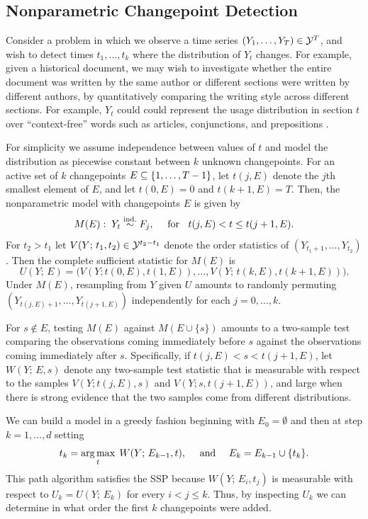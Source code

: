 \documentclass{article}
\begin{document}
\subsection{Nonparametric Changepoint Detection}\label{sec:nonpar}

Consider a problem in which we observe a time series $(Y_1,\ldots,Y_T)\in \mathcal{Y}^T$, and wish to detect times $t_1,\ldots,t_k$ where the distribution of $Y_t$ changes. For example, given a historical document, we may wish to investigate whether the entire document was written by the same author or different sections were written by different authors, by quantitatively comparing the writing style across different sections. For example, $Y_t$ could could represent the usage distribution in section $t$ over ``context-free'' words such as articles, conjunctions, and prepositions \citep[see e.g.,][]{chen2015graph}.

For simplicity we assume independence between values of $t$ and model the distribution as piecewise constant between $k$ unknown changepoints. For an active set of $k$ changepoints $E\subseteq \{1,\ldots, T-1\}$, let $t(j,E)$ denote the $j$th smallest element of $E$, and let $t(0,E)=0$ and $t(k+1, E)=T$. Then, the nonparametric model with changepoints $E$ is given by
\begin{equation}\label{eq:nonpar-model}
  M(E):\; Y_t \overset{\textrm{ind.}}{\sim} F_j, \quad \text{ for } \;\;t(j,E) < t \leq t(j+1,E).
\end{equation}
For $t_2>t_1$ let $V(Y;\, t_1, t_2)\in \mathcal{Y}^{t_2-t_1}$ denote the order statistics of $(Y_{t_1+1},\ldots, Y_{t_2})$. Then the complete sufficient statistic for $M(E)$ is
\[
U(Y; \, E) = 
\bigg(
V(Y; t(0, E), t(1, E)), \ldots, V(Y;\, t(k, E), t(k+1,E))
\bigg).
\]
Under $M(E)$, resampling from $Y$ given $U$ amounts to randomly permuting $(Y_{t(j,E)+1}, \ldots, Y_{t(j+1,E)})$ independently for each $j=0,\ldots,k$.

For $s \notin E$, testing $M(E)$ against $M(E \cup \{s\})$ amounts to a two-sample test comparing the observations coming immediately before $s$ against the observations coming immediately after $s$. Specifically, if $t(j, E) < s < t(j+1, E)$, let $W(Y; \, E, s)$ denote any two-sample test statistic that is measurable with respect to the samples $V(Y; t(j, E), s)$ and $V(Y; s, t(j+1, E))$, and large when there is strong evidence that the two samples come from different distributions. 

We can build a model in a greedy fashion beginning with $E_0 = \emptyset$ and then at step $k=1,\ldots,d$ setting
\begin{equation*}
  t_k = \operatorname*{arg\,max}_t \; W(Y; \, E_{k-1}, t), 
  \quad \text{ and } \quad E_k = E_{k-1} \cup \{t_k\}.
\end{equation*}
This path algorithm satisfies the SSP because $W(Y; \, E_{i}, t_j)$ is measurable with respect to $U_k=U(Y; \, E_k)$ for every $i<j\leq k$. Thus, by inspecting $U_k$ we can determine in what order the first $k$ changepoints were added. 
\end{document}
